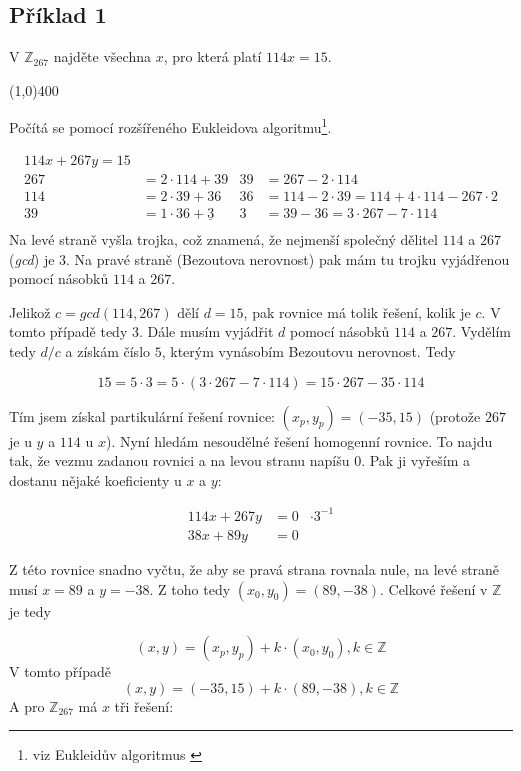 \documentclass{article}
\begin{document}
\subsection{Příklad 1}
V $\mathbb{Z}_{267}$ najděte všechna $x$, pro která platí $114x = 15$.

\line(1,0){400}

Počítá se pomocí rozšířeného Eukleidova algoritmu\footnote{viz Eukleidův algoritmus \cite[str. 50]{velebil07}}.


\begin{align*}
114x + 267y = 15 & 								& 		&  \\
267 & = 2\cdot 114 + 39 					& 39	&= 267-2\cdot 114 \\
114 & = 2\cdot 39 + 36 						& 36 	&= 114-2\cdot 39 = 114 + 4\cdot 114 - 267 \cdot 2 \\
39  & = 1\cdot 36 + \underline{3}	& 3 	&= 39 - 36 = 3\cdot 267 - 7 \cdot 114 \\
\end{align*}
Na levé straně vyšla trojka, což znamená, že nejmenší společný dělitel $114$ a $267$ (\emph{gcd}) je $3$. Na pravé straně (Bezoutova nerovnost) pak mám tu trojku vyjádřenou pomocí násobků $114$ a $267$.

Jelikož $c = gcd(114,267)$ dělí $d = 15$, pak rovnice má tolik řešení, kolik je $c$. V tomto případě tedy $3$. Dále musím vyjádřit $d$ pomocí násobků $114$ a $267$. Vydělím tedy $d/c$ a získám číslo $5$, kterým vynásobím Bezoutovu nerovnost. Tedy

$$15 = 5\cdot 3 = 5\cdot (3\cdot 267 - 7 \cdot 114) = 15\cdot 267 - 35\cdot 114$$

Tím jsem získal partikulární řešení rovnice: $(x_p, y_p) = (-35, 15)$ (protože $267$ je u $y$ a $114$ u $x$).
Nyní hledám nesoudělné řešení homogenní rovnice. To najdu tak, že vezmu zadanou rovnici a na levou stranu napíšu $0$. Pak ji vyřeším a dostanu nějaké koeficienty u $x$ a $y$:

\begin{align*}
114x + 267y &= 0 & \cdot 3^{-1} \\
38x + 89y & = 0 
\end{align*} 
  
Z této rovnice snadno vyčtu, že aby se pravá strana rovnala nule, na levé straně musí $x = 89$ a $y = -38$. Z toho tedy $(x_0, y_0) = (89, -38)$.
Celkové řešení v $\mathbb{Z}$ je tedy

$$ (x, y) = (x_p, y_p) + k\cdot (x_0, y_0), k \in \mathbb{Z} $$
V tomto případě
$$ (x, y) = (-35, 15) + k\cdot (89, -38),k \in \mathbb{Z} $$
A pro $\mathbb{Z}_{267}$ má $x$ tři řešení:
\end{document}
